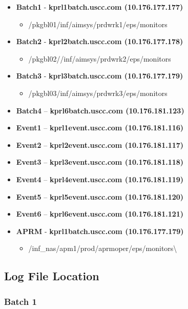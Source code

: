 \documentclass[12pt,twoside]{article}
\begin{document}
\begin{itemize}
\item \textbf{Batch1} - \textbf{kprl1batch.uscc.com (10.176.177.177)}
\begin{itemize}
\item \//pkgbl01\//inf\//aimsys\//prdwrk1\//eps\//monitors
\end{itemize}
\item \textbf{Batch2} - \textbf{kprl2batch.uscc.com (10.176.177.178)}
\begin{itemize}
\item \//pkgbl02\///inf\//aimsys\//prdwrk2\//eps\//monitors
\end{itemize}
\item \textbf{Batch3} - \textbf{kprl3batch.uscc.com (10.176.177.179)}
\begin{itemize}
\item \//pkgbl03\//inf\//aimsys\//prdwrk3\//eps\//monitors
\end{itemize}
\item \textbf{Batch4} – \textbf{kprl6batch.uscc.com (10.176.181.123)}
\item \textbf{Event1} – \textbf{kprl1event.uscc.com (10.176.181.116)}
\item \textbf{Event2} – \textbf{kprl2event.uscc.com (10.176.181.117)}
\item \textbf{Event3} – \textbf{kprl3event.uscc.com (10.176.181.118)}
\item \textbf{Event4} – \textbf{kprl4event.uscc.com (10.176.181.119)}
\item \textbf{Event5} – \textbf{kprl5event.uscc.com (10.176.181.120)}
\item \textbf{Event6} – \textbf{kprl6event.uscc.com (10.176.181.121)}
\item \textbf{APRM} - \textbf{kprl1batch.uscc.com (10.176.177.179)}
\begin{itemize}
\item \//inf\_nas\//apm1\//prod\//aprmoper\//eps\//monitors\textbackslash{}
\end{itemize}
\end{itemize}
\subsection{Log File Location}
\label{sec-3-10}
\subsubsection{Batch 1}
\label{sec-3-10-1}
\end{document}
